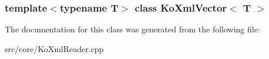 \subsubsection*{template$<$typename T$>$ class KoXmlVector$<$ T $>$}



The documentation for this class was generated from the following file:\begin{DoxyCompactItemize}
\item 
src/core/KoXmlReader.cpp\end{DoxyCompactItemize}
